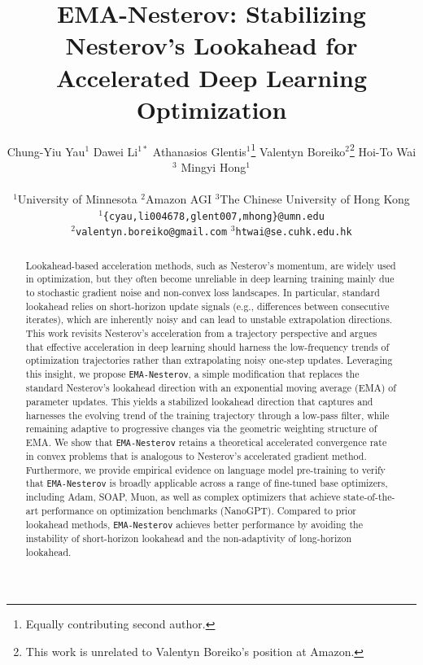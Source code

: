 \documentclass{article}
\title{EMA-Nesterov: Stabilizing Nesterov's Lookahead for Accelerated Deep Learning Optimization}
\author{%
  Chung-Yiu Yau$^1$ \And
  Dawei Li$^{1*}$ \And
  Athanasios Glentis$^{1}$\thanks{Equally contributing second author.}
  \AND
  Valentyn Boreiko$^2$\thanks{This work is unrelated to Valentyn Boreiko's position at Amazon.} \And
  Hoi-To Wai$^3$ \And
  Mingyi Hong$^1$ \\ \\
  $^1$University of Minnesota \qquad
  $^2$Amazon AGI \qquad
  $^3$The Chinese University of Hong Kong \\
  $^1$\texttt{\{cyau,li004678,glent007,mhong\}@umn.edu} \\
  $^2$\texttt{valentyn.boreiko@gmail.com} \qquad
  $^3$\texttt{htwai@se.cuhk.edu.hk}
}
\theoremstyle{plain}
\theoremstyle{definition}
\theoremstyle{remark}
\begin{document}
\maketitle


\begin{abstract}

Lookahead-based acceleration methods, such as Nesterov’s momentum, are widely used in optimization, but they often become unreliable in deep learning training mainly due to stochastic gradient noise and non-convex loss landscapes. In particular, standard lookahead relies on short-horizon update signals (e.g., differences between consecutive iterates), which are inherently noisy and can lead to unstable extrapolation directions.
This work revisits Nesterov’s acceleration from a trajectory perspective and argues that effective acceleration in deep learning should harness the low-frequency trends of optimization trajectories rather than extrapolating noisy one-step updates. Leveraging this insight, we propose {\tt EMA-Nesterov}, a simple modification that replaces the standard Nesterov’s lookahead direction with an exponential moving average (EMA) of parameter updates. This yields a stabilized lookahead direction that captures and harnesses the evolving trend of the training trajectory through a low-pass filter, while remaining adaptive to progressive changes via the geometric weighting structure of EMA.
We show that {\tt EMA-Nesterov} retains a theoretical accelerated convergence rate in convex problems that is analogous to Nesterov's accelerated gradient method. Furthermore, we provide empirical evidence on language model pre-training to verify that {\tt EMA-Nesterov} is broadly applicable across a range of fine-tuned base optimizers, including Adam, SOAP, Muon, as well as complex optimizers that achieve state-of-the-art performance on optimization benchmarks (NanoGPT). Compared to prior lookahead methods, {\tt EMA-Nesterov} achieves better performance by avoiding the instability of short-horizon lookahead and the non-adaptivity of long-horizon lookahead.
\end{abstract}
\vspace{-0.5\baselineskip}
\end{document}
